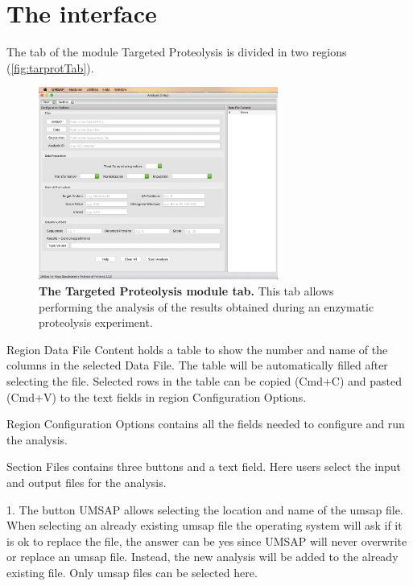 \section{The interface}

The tab of the module Targeted Proteolysis is divided in two regions (\autoref{fig:tarprotTab}).

\begin{figure}[h]
    \centering
    \includegraphics[width=0.7\textwidth]{./IMAGES/MOD-TARPROT/tarprot-mod.jpg}
    \caption[The Targeted Proteolysis module tab]{\textbf{The Targeted Proteolysis
    module tab.} This tab allows performing the analysis of the results obtained
    during an enzymatic proteolysis experiment.}
    \label{fig:tarprotTab}
    \vspace{-5pt}
\end{figure} 

Region Data File Content holds a table to show the number and name of the columns in
the selected Data File. The table will be automatically filled after selecting the
file. Selected rows in the table can be copied (Cmd+C) and pasted (Cmd+V) to the
text fields in region Configuration Options.

Region Configuration Options contains all the fields needed to configure and
run the analysis.

Section Files contains three buttons and a text field. Here users select the input
and output files for the analysis.

\num{1}. The button UMSAP allows selecting the location
and name of the umsap file. When selecting an already existing umsap file the operating
system will ask if it is ok to replace the file, the answer can be yes since UMSAP
will never overwrite or replace an umsap file. Instead, the new analysis will be
added to the already existing file. Only umsap files can be selected here.

